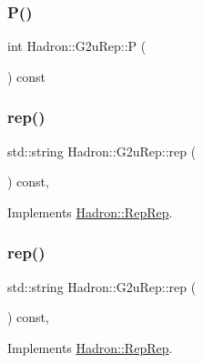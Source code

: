 \subsubsection{\texorpdfstring{P()}{P()}}
{\footnotesize\ttfamily int Hadron\+::\+G2u\+Rep\+::P (\begin{DoxyParamCaption}{ }\end{DoxyParamCaption}) const\hspace{0.3cm}{\ttfamily [inline]}}

\mbox{\label{structHadron_1_1G2uRep_ad0a703d8c70aacc4601afb6c47ca40b3}} 
\subsubsection{\texorpdfstring{rep()}{rep()}\hspace{0.1cm}{\footnotesize\ttfamily [1/3]}}
{\footnotesize\ttfamily std\+::string Hadron\+::\+G2u\+Rep\+::rep (\begin{DoxyParamCaption}{ }\end{DoxyParamCaption}) const\hspace{0.3cm}{\ttfamily [inline]}, {\ttfamily [virtual]}}



Implements \mbox{\hyperlink{structHadron_1_1RepRep_ab3213025f6de249f7095892109575fde}{Hadron\+::\+Rep\+Rep}}.

\mbox{\label{structHadron_1_1G2uRep_ad0a703d8c70aacc4601afb6c47ca40b3}} 
\subsubsection{\texorpdfstring{rep()}{rep()}\hspace{0.1cm}{\footnotesize\ttfamily [2/3]}}
{\footnotesize\ttfamily std\+::string Hadron\+::\+G2u\+Rep\+::rep (\begin{DoxyParamCaption}{ }\end{DoxyParamCaption}) const\hspace{0.3cm}{\ttfamily [inline]}, {\ttfamily [virtual]}}



Implements \mbox{\hyperlink{structHadron_1_1RepRep_ab3213025f6de249f7095892109575fde}{Hadron\+::\+Rep\+Rep}}.

